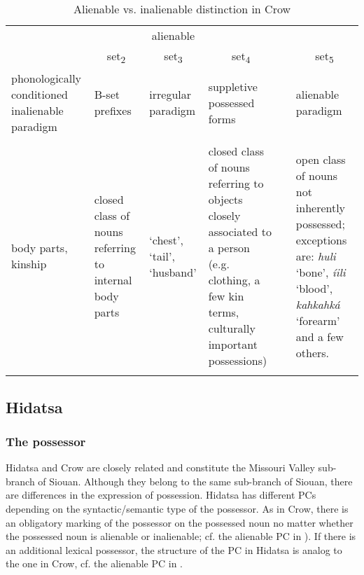 \documentclass[output=paper]{LSP/langsci}
\begin{document}
\begin{table}
\caption{Alienable vs. inalienable distinction in Crow} \label{crowalienability}  
\begin{tabularx}{\textwidth}{ Xp{2cm}XXcX }
\lsptoprule
\multicolumn{4}{c}{inalienable } && \multicolumn{1}{c}{alienable} \\
\hhline{----~-}
\multicolumn{1}{c}{set\textsubscript{1}} &
\multicolumn{1}{c}{ set\textsubscript{2}}	& 
\multicolumn{1}{c}{set\textsubscript{3}} & 
\multicolumn{1}{c}{set\textsubscript{4}} && 
\multicolumn{1}{c}{set\textsubscript{5}} \\
\midrule
phonologically conditioned inalienable paradigm & 	B-set  \mbox{prefixes} & irregular  paradigm & suppletive possessed forms && alienable paradigm \\ 
\\

body parts, kinship & 
 \raggedright closed class  of nouns  referring to  internal body  parts & 
`chest', `tail', `husband'	  & 
\raggedright closed class of nouns  referring to objects  closely associated to a person (e.g. clothing, a few kin terms, culturally  important possessions)  && 
open class of nouns not inherently possessed; exceptions are: \textit{huli}  `bone', \textit{íili} `blood',  \textit{kahkahká} `forearm' and a  few others. \\ 
\lspbottomrule
\end{tabularx}  
\end{table}

\subsection{Hidatsa}\label{sec:helmbrecht:4.2}
\subsubsection{The possessor}
Hidatsa and Crow are closely related and constitute the Missouri Valley sub-branch of Siouan. Although they belong to the same sub-branch of Siouan, there are differences in the expression of possession. Hidatsa has different PCs depending on the syntactic/semantic type of the possessor. As in Crow, there is an obligatory marking of the possessor on the possessed noun no matter whether the possessed noun is alienable or inalienable; cf. the alienable PC in ). If there is an additional lexical possessor, the structure of the PC in Hidatsa is analog to the one in Crow, cf. the alienable PC in .
\end{document}
